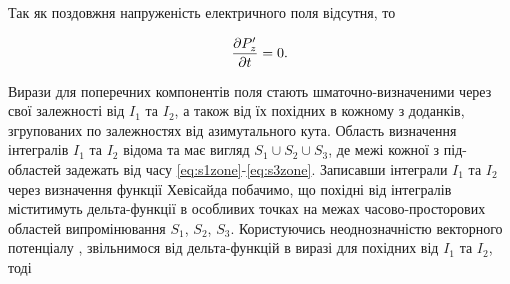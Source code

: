%

Так як поздовжня напруженість електричного поля відсутня, то

\begin{equation*} \begin{aligned}
\frac{\partial P_z^\prime}{\partial t} = 0.
\end{aligned} \end{equation*}

Вирази для поперечних компонентів поля стають шматочно-визначеними
через свої залежності від $ I_1 $ та $ I_2 $, а також від їх похідних в 
кожному з доданків, згрупованих по залежностях від азимутального кута.
Область визначення інтегралів $ I_1 $ та $ I_2 $ відома та має вигляд 
$ S_1 \cup S_2 \cup S_3 $, де межі кожної з під-областей задежать від часу 
\eqref{eq:s1zone}-\eqref{eq:s3zone}. Записавши інтеграли $ I_1 $ та $ I_2 $ 
через визначення функції Хевісайда побачимо, що похідні від інтегралів 
міститимуть дельта-функції в особливих точках на межах часово-просторових 
областей випромінювання $ S_1 $, $ S_2 $, $ S_3 $. Користуючись неоднозначністю 
векторного потенціалу \cite[ст. 77]{imp:LandauII}, звільнимося від дельта-функцій 
в виразі для похідних від $ I_1 $ та $ I_2 $, тоді

